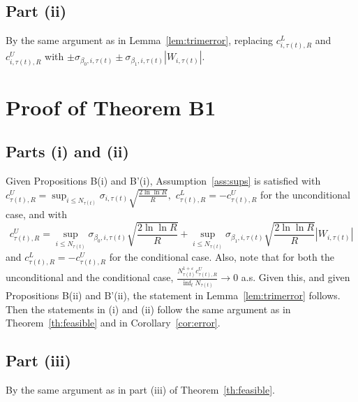 \subsection{Part (ii)}

By the same argument as in Lemma~\ref{lem:trimerror}, replacing $c_{i,\tau(t),R}^{L}$ and $c_{i,\tau(t),R}^{U}$ with $\pm
\sigma _{\beta _{0},i,\tau(t)}\pm \sigma _{\beta
_{1},i,\tau(t)}\left\vert W_{i,\tau(t)}\right\vert .$


\section{Proof of Theorem B1}

\subsection{Parts (i) and (ii)}

Given Propositions B(i) and B'(i), Assumption~\ref{ass:sups} is satisfied with $c_{\tau(t),R}^{U}=\sup_{i\leq
N_{\tau(t)}}\sigma _{i,\tau(t)}%
\sqrt{\frac{2\ln \ln R}{R}},$ $c_{\tau(t),R}^{L}=-c_{\tau(t),R}^{U}$ for the unconditional case, and with 
\begin{equation*}
c_{\tau(t),R}^{U}=\sup_{i\leq N_{\tau(t)}}\sigma _{\beta _{0},i,\tau(t)}%
\sqrt{\frac{2\ln \ln R}{R}}+\sup_{i\leq N_{\tau(t)}}
\sigma _{\beta _{1},i,\tau(t)}\sqrt{\frac{2\ln
\ln R}{R}}\left\vert W_{i,\tau(t)}\right\vert
\end{equation*}%
and $c_{\tau(t),R}^{L}=-c_{\tau(t),R}^{U}$ for the conditional case. Also, note that for both the unconditional and the conditional case, $\frac{N_{\tau(t)}^{1+\varepsilon
}c_{\tau(t),R}^{U}}{\inf_{t}N_{\tau(t)}}\rightarrow 0$ a.s. Given this, and given Propositions B(ii)
and B'(ii), the statement in Lemma~\ref{lem:trimerror} follows. Then the
statements in (i) and (ii) follow the same argument as in Theorem~\ref{th:feasible} and in Corollary~\ref{cor:error}.

\subsection{Part (iii)}
 
By the same argument as in part (iii) of Theorem~\ref{th:feasible}.


